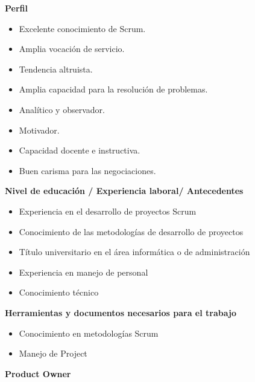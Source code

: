 \begin{itemize}
            \item \textbf{Perfil}
            	\begin{itemize}
                    \item Excelente conocimiento de Scrum.
                    \item Amplia vocación de servicio.
                    \item Tendencia altruista.
                    \item Amplia capacidad para la resolución de problemas.
                    \item Analítico y observador.
                    \item Motivador.
                    \item Capacidad docente e instructiva.
                    \item Buen carisma para las negociaciones.
				\end{itemize}
            {\correccionTexto    
            \item \textbf{Nivel de educación / Experiencia laboral/ Antecedentes}
                \begin{itemize}
                    \item  Experiencia en el desarrollo de proyectos Scrum
					\item Conocimiento de las metodologías de desarrollo de proyectos
					\item Título universitario en el área informática o de administración
					\item Experiencia en manejo de personal
					\item Conocimiento técnico 
                \end{itemize}
            \item \textbf{Herramientas y documentos necesarios para el trabajo}
            	\begin{itemize}
                    \item Conocimiento en metodologías Scrum
                    \item Manejo de Project
                    
                \end{itemize}   
            }
			\end{itemize}
        
        
        \textbf{Product Owner}
        
